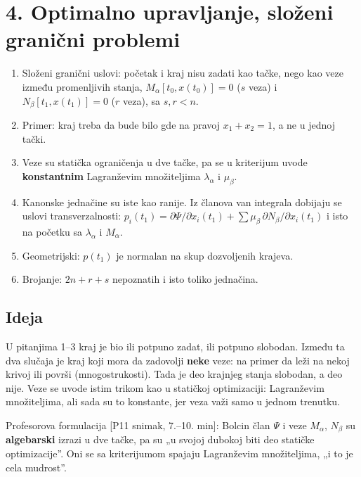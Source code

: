 \documentclass[11pt,a4paper,parskip=half,headsepline,numbers=noenddot]{scrartcl}
\DeclareRobustCommand{\izvor}[1]{{\small\color{izvorC}[#1]}}
\begin{document}
\section{4. Optimalno upravljanje, složeni granični problemi}

\begin{kljucna}
\begin{enumerate}
\def\labelenumi{\arabic{enumi}.}
\item Složeni granični uslovi: početak i kraj nisu zadati kao tačke, nego kao veze između promenljivih stanja, \(M_\alpha[t_0, x(t_0)] = 0\) (\(s\) veza) i \(N_\beta[t_1, x(t_1)] = 0\) (\(r\) veza), sa \(s, r < n\).
\item Primer: kraj treba da bude bilo gde na pravoj \(x_1 + x_2 = 1\), a ne u jednoj tački.
\item Veze su statička ograničenja u dve tačke, pa se u kriterijum uvode \textbf{konstantnim} Lagranževim množiteljima \(\lambda_\alpha\) i \(\mu_\beta\).
\item Kanonske jednačine su iste kao ranije. Iz članova van integrala dobijaju se uslovi transverzalnosti: \(p_i(t_1) = \partial\Psi/\partial x_i(t_1) + \sum\mu_\beta\,\partial N_\beta/\partial x_i(t_1)\) i isto na početku sa \(\lambda_\alpha\) i \(M_\alpha\).
\item Geometrijski: \(p(t_1)\) je normalan na skup dozvoljenih krajeva.
\item Brojanje: \(2n + r + s\) nepoznatih i isto toliko jednačina.
\end{enumerate}
\end{kljucna}

\subsection{Ideja}

U pitanjima 1--3 kraj je bio ili potpuno zadat, ili potpuno slobodan. Između ta dva slučaja je kraj koji mora da zadovolji \textbf{neke} veze: na primer da leži na nekoj krivoj ili površi (mnogostrukosti). Tada je deo krajnjeg stanja slobodan, a deo nije. Veze se uvode istim trikom kao u statičkoj optimizaciji: Lagranževim množiteljima, ali sada su to konstante, jer veza važi samo u jednom trenutku.

Profesorova formulacija \izvor{P11 snimak, 7.--10. min}: Bolcin član \(\Psi\) i veze \(M_\alpha\), \(N_\beta\) su \textbf{algebarski} izrazi u dve tačke, pa su „u svojoj dubokoj biti deo statičke optimizacije''. Oni se sa kriterijumom spajaju Lagranževim množiteljima, „i to je cela mudrost''.
\end{document}
